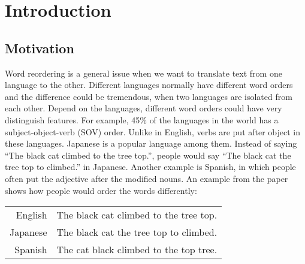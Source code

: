 
\chapter{Introduction}
\label{ch:Introduction}

\section{Motivation}
\label{ch:Introduction:sec:Motivation}

Word reordering is a general issue when we want to translate text from one language to the other. Different languages normally have different word orders and the difference could be tremendous, when two languages are isolated from each other. Depend on the languages, different word orders could have very distinguish features. For example, 45\% of the languages in the world has a subject-object-verb (SOV) order. Unlike in English, verbs are put after object in these languages. Japanese is a popular language among them. Instead of saying ``The black cat climbed to the tree top.'', people would say ``The black cat the tree top to climbed.'' in Japanese. Another example is Spanish, in which people often put the adjective after the modified nouns. An example from the paper \cite{google} shows how people would order the words differently:


\begin{center}
\begin{tabular}{ r l }
English & The black cat climbed to the tree top. \\
Japanese & The black cat the tree top to climbed. \\
Spanish & The cat black climbed to the top tree. \\
\end{tabular}
\end{center}

